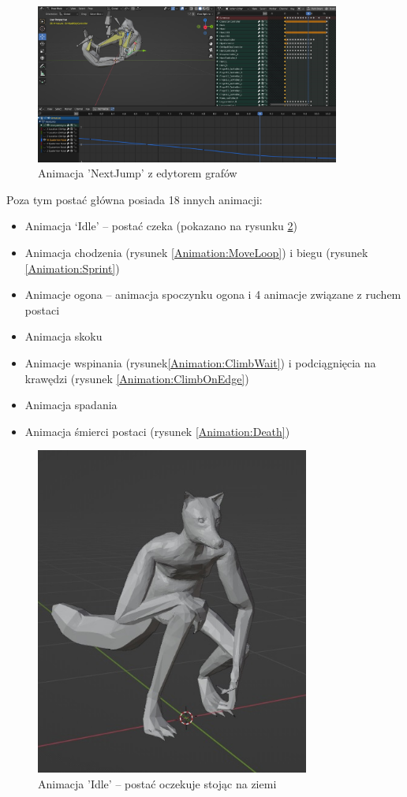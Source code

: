 \documentclass[12pt,twoside]{article}
\begin{document}
\begin{figure}[!ht]
    \centering
	\includegraphics[width=10cm]{RealizacjaProjektu/MC/Animation_NextJump_problem.jpg}
	\caption{Animacja 'NextJump' z edytorem grafów}
    \label{Animation:NextJumpProblem}
\end{figure}

Poza tym postać główna posiada 18 innych animacji:
\begin{itemize}
\item Animacja `Idle' -- postać czeka (pokazano na rysunku \ref{Animation:Idle})
\item Animacja chodzenia (rysunek \ref{Animation:MoveLoop}) i biegu (rysunek \ref{Animation:Sprint})
\item Animacje ogona -- animacja spoczynku ogona i 4 animacje związane z ruchem postaci
\item Animacja skoku
\item Animacje wspinania (rysunek\ref{Animation:ClimbWait}) i podciągnięcia na krawędzi (rysunek \ref{Animation:ClimbOnEdge})
\item Animacja spadania
\item Animacja śmierci postaci (rysunek \ref{Animation:Death})
\end{itemize}

\begin{figure}[!ht]
    \centering
	\includegraphics[width=9cm]{RealizacjaProjektu/MC/Animation_Idle_pose.jpg}
	\caption{Animacja 'Idle' -- postać oczekuje stojąc na ziemi}
    \label{Animation:Idle}
\end{figure}
\end{document}
